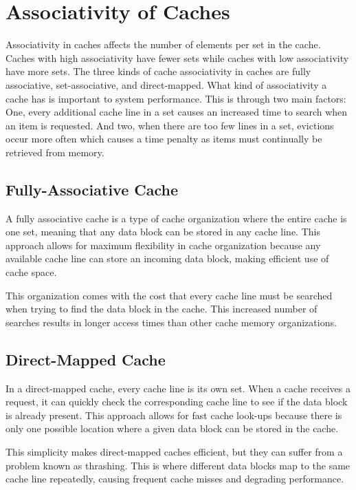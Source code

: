 \section{Associativity of Caches}
Associativity in caches affects the number of elements per set in the cache. Caches with high associativity have fewer sets while caches with low associativity have more sets. The three kinds of cache associativity in caches are fully associative, set-associative, and direct-mapped. What kind of associativity a cache has is important to system performance. This is through two main factors: One, every additional cache line in a set causes an increased time to search when an item is requested. And two, when there are too few lines in a set, evictions occur more often which causes a time penalty as items must continually be retrieved from memory.



\subsection{Fully-Associative Cache}

A fully associative cache is a type of cache organization where the entire cache is one set, meaning that any data block can be stored in any cache line. This approach allows for maximum flexibility in cache organization because any available cache line can store an incoming data block, making efficient use of cache space.


This organization comes with the cost that every cache line must be searched when trying to find the data block in the cache. This increased number of searches results in longer access times than other cache memory organizations.

\subsection{Direct-Mapped Cache}

In a direct-mapped cache, every cache line is its own set. When a cache receives a request, it can quickly check the corresponding cache line to see if the data block is already present. This approach allows for fast cache look-ups because there is only one possible location where a given data block can be stored in the cache.


This simplicity makes direct-mapped caches efficient, but they can suffer from a problem known as thrashing. This is where different data blocks map to the same cache line repeatedly, causing frequent cache misses and degrading performance. 

